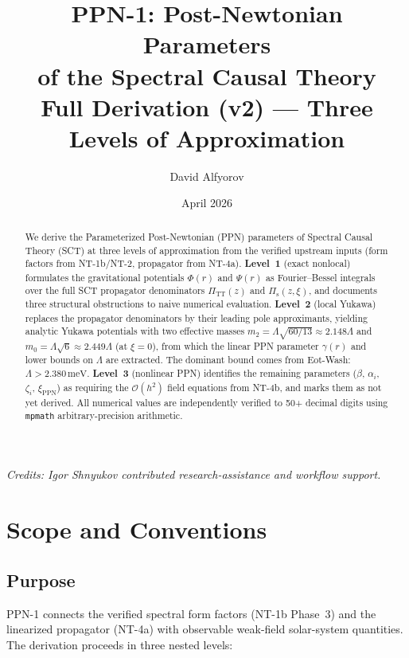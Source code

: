 \documentclass[11pt,a4paper]{article}
\title{%
  \textbf{PPN-1: Post-Newtonian Parameters}\\[4pt]
  \textbf{of the Spectral Causal Theory}\\[6pt]
  \large Full Derivation (v2) --- Three Levels of Approximation
}
\author{David Alfyorov}
\date{April 2026}
\newcommand{\PiTT}{\Pi_{\mathrm{TT}}}
\newcommand{\Pis}{\Pi_{\mathrm{s}}}
\newcommand{\order}{\mathcal{O}}
\begin{document}
\maketitle

\begin{center}
\small\textit{Credits: Igor Shnyukov contributed research-assistance and workflow support.}
\end{center}

\begin{abstract}
We derive the Parameterized Post-Newtonian (PPN) parameters of Spectral
Causal Theory (SCT) at three levels of approximation from the verified
upstream inputs (form factors from NT-1b/NT-2, propagator from NT-4a).
\textbf{Level~1} (exact nonlocal) formulates the gravitational potentials
$\Phi(r)$ and $\Psi(r)$ as Fourier--Bessel integrals over the full SCT
propagator denominators $\PiTT(z)$ and $\Pis(z,\xi)$, and documents
three structural obstructions to naive numerical evaluation.
\textbf{Level~2} (local Yukawa) replaces the propagator denominators by
their leading pole approximants, yielding analytic Yukawa potentials with
two effective masses $m_2 = \Lambda\sqrt{60/13} \approx 2.148\Lambda$ and
$m_0 = \Lambda\sqrt{6} \approx 2.449\Lambda$ (at $\xi = 0$),
from which the linear PPN parameter $\gamma(r)$ and lower bounds on
$\Lambda$ are extracted.  The dominant bound comes from
Eot-Wash: $\Lambda > 2.380\,\mathrm{meV}$.
\textbf{Level~3} (nonlinear PPN) identifies the remaining parameters
($\beta$, $\alpha_i$, $\zeta_i$, $\xi_\mathrm{PPN}$) as requiring the
$\order(h^2)$ field equations from NT-4b, and marks them as not yet derived.
All numerical values are independently verified to 50+ decimal digits
using \texttt{mpmath} arbitrary-precision arithmetic.
\end{abstract}

\tableofcontents
\newpage


\section{Scope and Conventions}
\label{sec:scope}

\subsection{Purpose}

PPN-1 connects the verified spectral form factors (NT-1b Phase~3) and the
linearized propagator (NT-4a) with observable weak-field solar-system
quantities.  The derivation proceeds in three nested levels:
\end{document}
